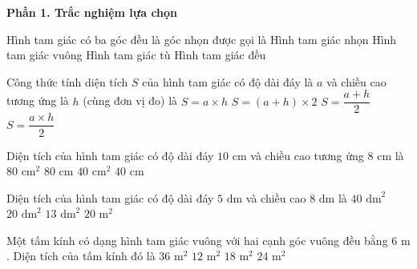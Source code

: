\textbf{Phần 1. Trắc nghiệm lựa chọn}

\begin{ex} %
Hình tam giác có ba góc đều là góc nhọn được gọi là
\choice
{\True Hình tam giác nhọn}
{Hình tam giác vuông}
{Hình tam giác tù}
{Hình tam giác đều}
\end{ex}

\begin{ex} %
Công thức tính diện tích $S$ của hình tam giác có độ dài đáy là $a$ và chiều cao tương ứng là $h$ (cùng đơn vị đo) là
\choice
{$S = a \times h$}
{$S = (a + h) \times 2$}
{$S = \dfrac{a + h}{2}$}
{\True $S = \dfrac{a \times h}{2}$}
\end{ex}

\begin{ex} %
Diện tích của hình tam giác có độ dài đáy $10\text{ cm}$ và chiều cao tương ứng $8\text{ cm}$ là
\choice
{$80\text{ cm}^2$}
{$80\text{ cm}$}
{\True $40\text{ cm}^2$}
{$40\text{ cm}$}
\end{ex}

\begin{ex} %
Diện tích của hình tam giác có độ dài đáy $5\text{ dm}$ và chiều cao $8\text{ dm}$ là
\choice
{$40\text{ dm}^2$}
{\True $20\text{ dm}^2$}
{$13\text{ dm}^2$}
{$20\text{ m}^2$}
\end{ex}

\begin{ex} %
Một tấm kính có dạng hình tam giác vuông với hai cạnh góc vuông đều bằng $6\text{ m}$. Diện tích của tấm kính đó là
\choice
{$36\text{ m}^2$}
{$12\text{ m}^2$}
{\True $18\text{ m}^2$}
{$24\text{ m}^2$}
\end{ex}

